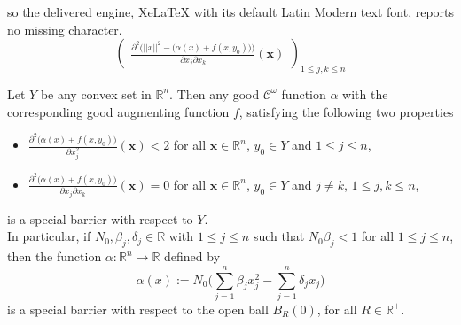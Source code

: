 \documentclass[10pt,a4paper]{amsart}
\def\R{\mathbb{R}}                              %
\begin{document}
so the delivered engine, XeLaTeX with its default Latin Modern text font, reports no missing character.
\begin{equation}\label{matrix_cond}
\begin{pmatrix}
\frac{\partial^2\Big(||x||^2-\big(\alpha(x)+f(x,y_0)\big)\Big)}{\partial x_j\partial x_k}(\textbf{x})
\end{pmatrix}_{1\leq j,k \leq n}\end{equation}

\begin{proposition}\label{prop_special_bar}
Let $Y$ be any convex set in $\R^n.$ Then any good $\mathcal{C}^{\omega}$ function $\alpha$ with the corresponding good augmenting function $f$, satisfying the following two properties
\begin{itemize}
	\item[(a)] $\frac{\partial^2\big(\alpha(x)+f(x,y_0)\big)}{\partial x_j^2}(\mathbf{x})<2$ for all $\mathbf{x}\in \R^n$, $y_0\in Y$ and $1\leq j\leq n$,
	\item [(b)] $\frac{\partial^2\big(\alpha(x)+f(x,y_0)\big)}{\partial x_j\partial x_k }(\mathbf{x})=0$ for all $\mathbf{x}\in \R^n$, $y_0\in Y$ and $ j\neq k$, $1\leq j,k\leq n$,
\end{itemize}
is a special barrier with respect to $Y$. \\

In particular, if $N_0,\beta_j, \delta_j\in \R$ with ${1\leq j\leq n}$ such that $N_0\beta_j<1$ for all $1\leq j\leq n$, then the function $\alpha:\R^n \to \R$ defined by
$$ \alpha(x):=N_0\big(\sum_{j=1}^{n}\beta_jx_j^2-\sum_{j=1}^{n}\delta_jx_j\big) $$ is a special barrier with respect to the open ball $B_R(0)$, for all $R\in \R^+.$
\end{proposition}
\end{document}
